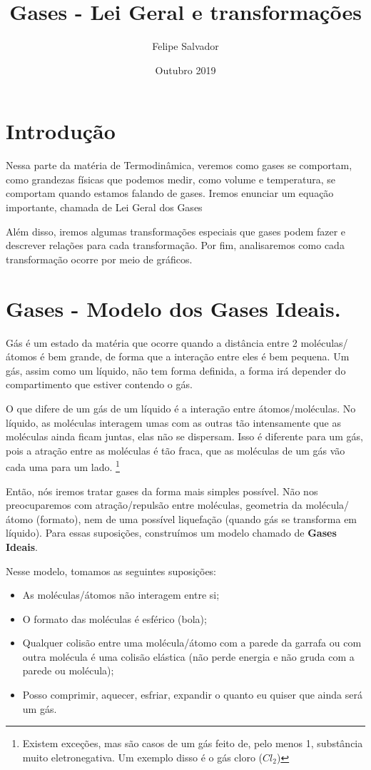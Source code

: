 \documentclass[12pt]{extarticle}
\title{Gases - Lei Geral e transformações}
\author{Felipe Salvador}
\date{Outubro 2019}
\newcommand{\<}{\langle}
\renewcommand{\>}{\rangle}
\theoremstyle{definition}
\begin{document}
\maketitle

\section*{Introdução}
    
    Nessa parte da matéria de Termodinâmica, veremos como gases se comportam, como grandezas físicas que podemos medir, como volume e temperatura, se comportam quando estamos falando de gases. Iremos enunciar um equação importante, chamada de Lei Geral dos Gases
    
    Além disso, iremos algumas transformações especiais que gases podem fazer e descrever relações para cada transformação. Por fim, analisaremos como cada transformação ocorre por meio de gráficos.
    
    
\section{Gases - Modelo dos Gases Ideais.}
    
    Gás é um estado da matéria que ocorre quando a distância entre 2 moléculas/átomos é bem grande, de forma que a interação entre eles é bem pequena. Um gás, assim como um líquido, não tem forma definida, a forma irá depender do compartimento que estiver contendo o gás. 
    
    O que difere de um gás de um líquido é a interação entre átomos/moléculas. No líquido, as moléculas interagem umas com as outras tão intensamente que as moléculas ainda ficam juntas, elas não se dispersam. Isso é diferente para um gás, pois a atração entre as moléculas é tão fraca, que as moléculas de um gás vão cada uma para um lado. \footnote{Existem exceções, mas são casos de um gás feito de, pelo menos 1, substância muito eletronegativa. Um exemplo disso é o gás cloro ($Cl_2$)}
    
    Então, nós iremos tratar gases da forma mais simples possível. Não nos preocuparemos com atração/repulsão entre moléculas, geometria da molécula/átomo (formato), nem de uma possível liquefação (quando gás se transforma em líquido). Para essas suposições, construímos um modelo chamado de \textbf{Gases Ideais}.
    
    Nesse modelo, tomamos as seguintes suposições:
    \begin{itemize}
        \item As moléculas/átomos não interagem entre si;
        \item O formato das moléculas é esférico (bola);
        \item Qualquer colisão entre uma molécula/átomo com a parede da garrafa ou com outra molécula é uma colisão elástica (não perde energia e não gruda com a parede ou molécula);
        \item Posso comprimir, aquecer, esfriar, expandir o quanto eu quiser que ainda será um gás.
    \end{itemize}
    
\end{document}
